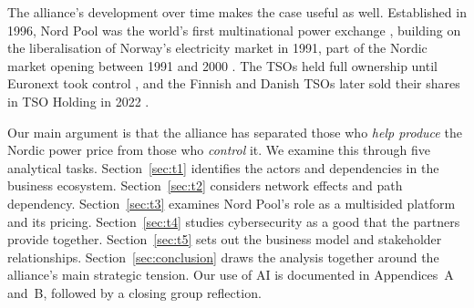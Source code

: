 The alliance's development over time makes the case useful as well. Established in 1996, Nord Pool was the world's first multinational power exchange \citep{NPAbout}, building on the liberalisation of Norway's electricity market in 1991, part of the Nordic market opening between 1991 and 2000 \citep{AmundsenBergman2006}. The TSOs held full ownership until Euronext took control \citep{Euronext2020}, and the Finnish and Danish TSOs later sold their shares in TSO Holding in 2022 \citep{EPSOG2022Completed}.

Our main argument is that the alliance has separated those who \emph{help produce} the Nordic power price from those who \emph{control} it. We examine this through five analytical tasks. Section~\ref{sec:t1} identifies the actors and dependencies in the business ecosystem. Section~\ref{sec:t2} considers network effects and path dependency. Section~\ref{sec:t3} examines Nord Pool's role as a multisided platform and its pricing. Section~\ref{sec:t4} studies cybersecurity as a good that the partners provide together. Section~\ref{sec:t5} sets out the business model and stakeholder relationships. Section~\ref{sec:conclusion} draws the analysis together around the alliance's main strategic tension. Our use of AI is documented in Appendices~A and~B, followed by a closing group reflection.
